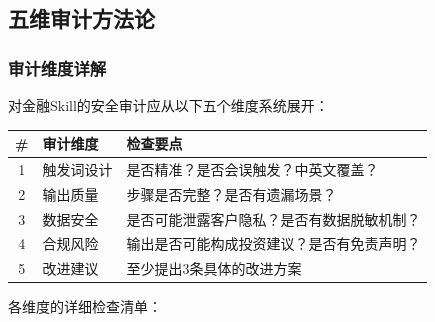 \subsection{五维审计方法论}

\subsubsection{审计维度详解}

对金融Skill的安全审计应从以下五个维度系统展开：

\begin{table}[H]
\centering
\begin{tabular}{clp{6.5cm}}
\toprule
\textbf{\#} & \textbf{审计维度} & \textbf{检查要点} \\
\midrule
1 & 触发词设计 & 是否精准？是否会误触发？中英文覆盖？ \\
2 & 输出质量 & 步骤是否完整？是否有遗漏场景？ \\
3 & 数据安全 & 是否可能泄露客户隐私？是否有数据脱敏机制？ \\
4 & 合规风险 & 输出是否可能构成投资建议？是否有免责声明？ \\
5 & 改进建议 & 至少提出3条具体的改进方案 \\
\bottomrule
\end{tabular}
\end{table}

各维度的详细检查清单：

